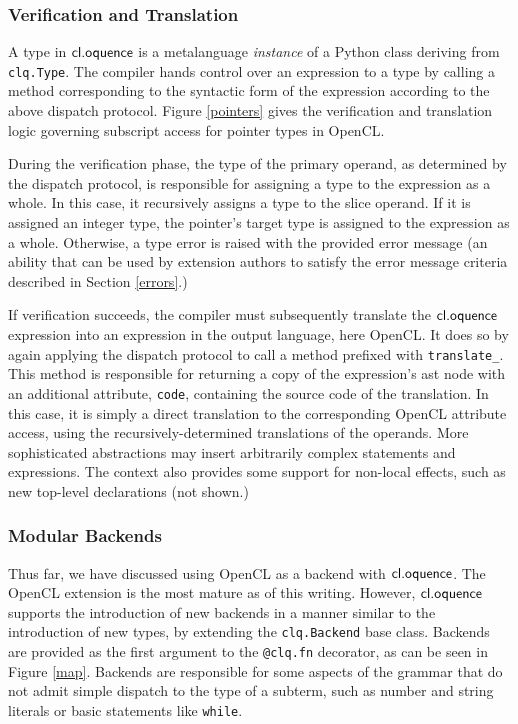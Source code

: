 \documentclass[10pt, conference, compsocconf]{IEEEtran}
\begin{document}
\subsubsection{Verification and Translation}
A type in $\textsf{cl.oquence}$ is a metalanguage {\it instance} of a Python class deriving from \verb|clq.Type|. The compiler hands control over an expression to a type by calling a method corresponding to the syntactic form of the expression according to the above dispatch protocol. Figure \ref{pointers} gives the verification and translation logic governing subscript access for pointer types in OpenCL.

During the verification phase, the type of the primary operand, as determined by the dispatch protocol, is responsible for assigning a type to the expression as a whole. In this case, it recursively assigns a type to the slice operand. If it is assigned an integer type, the pointer's target type is assigned to the expression as a whole. Otherwise, a type error is raised with the provided error message (an ability that can be used by extension authors to satisfy the error message criteria described in Section \ref{errors}.) 

If verification succeeds, the compiler must subsequently translate the $\textsf{cl.oquence}$ expression into an expression in the output language, here OpenCL. It does so by again applying the dispatch protocol to call a method prefixed with \verb|translate_|. This method is responsible for returning a copy of the expression's ast node with an additional attribute, \verb|code|, containing the source code of the translation. In this case, it is simply a direct translation to the corresponding OpenCL attribute access, using the recursively-determined translations of the operands. More sophisticated abstractions may insert arbitrarily complex statements and expressions. The context also provides some support for non-local effects, such as new top-level declarations (not shown.)

\subsubsection{Modular Backends}\label{backends}
Thus far, we have discussed using OpenCL as a backend with $\textsf{cl.oquence}$. The OpenCL extension is the most mature as of this writing. However, $\textsf{cl.oquence}$ supports the introduction of new backends in a manner similar to the introduction of new types, by extending the \verb|clq.Backend| base class. Backends are provided as the first argument to the \verb|@clq.fn| decorator, as can be seen in Figure \ref{map}. 
Backends are responsible for some aspects of the grammar that do not admit simple dispatch to the type of a subterm, such as number and string literals or basic statements like \verb|while|.
\end{document}
